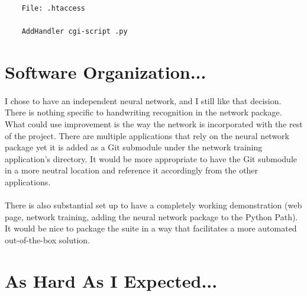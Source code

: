 \documentclass{article}
\begin{document}
    \begin{lstlisting}
    File: .htaccess

    AddHandler cgi-script .py
    \end{lstlisting}

\section{Software Organization...}

    \paragraph{}I chose to have an independent neural network, and I still like 
    that decision. There is nothing specific to handwriting recognition in the
    network package. What could use improvement is the way the network is 
    incorporated with the rest of the project. There are multiple applications 
    that rely on the neural network package yet it is added as a Git submodule 
    under the network training application's directory. It would be more 
    appropriate to have the Git submodule in a more neutral location and
    reference it accordingly from the other applications. 
    
    \paragraph{}There is also substantial set up to have a completely working
    demonstration (web page, network training, adding the neural network package
    to the Python Path). It would be nice to package the suite in a way that 
    facilitates a more automated out-of-the-box solution.

\section{As Hard As I Expected...}
\end{document}
